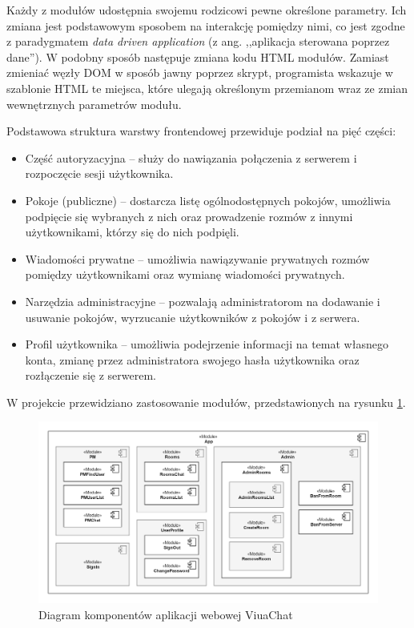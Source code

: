 Każdy z modułów udostępnia swojemu rodzicowi pewne określone parametry. Ich zmiana
jest podstawowym sposobem na interakcję pomiędzy nimi, co jest zgodne z
paradygmatem \textit{data driven application} (z ang. ,,aplikacja sterowana
poprzez dane''). W podobny sposób następuje zmiana kodu HTML modułów. Zamiast
zmieniać węzły DOM w sposób jawny poprzez skrypt, programista wskazuje w
szablonie HTML te miejsca, które ulegają określonym przemianom wraz ze
zmian wewnętrznych parametrów modułu.

Podstawowa struktura warstwy frontendowej przewiduje podział na
pięć części:
\begin{itemize}
	\item Część autoryzacyjna -- służy do nawiązania połączenia z
	serwerem i rozpoczęcie sesji użytkownika.

	\item Pokoje (publiczne) -- dostarcza listę ogólnodostępnych pokojów,
	umożliwia podpięcie się wybranych z nich oraz prowadzenie rozmów z
	innymi użytkownikami, którzy się do nich podpięli.

	\item Wiadomości prywatne -- umożliwia nawiązywanie prywatnych
	rozmów pomiędzy użytkownikami oraz wymianę wiadomości prywatnych.

	\item Narzędzia administracyjne -- pozwalają administratorom
	na dodawanie i usuwanie pokojów, wyrzucanie użytkowników z pokojów
	i z serwera.

	\item Profil użytkownika -- umożliwia podejrzenie informacji na
	temat własnego konta, zmianę przez administratora swojego hasła
	użytkownika oraz rozłączenie się z serwerem.

\end{itemize}

W projekcie przewidziano zastosowanie modułów, przedstawionych na rysunku \ref{diag-komp-front}.

\begin{figure}[!htp]
	\centering
	\includegraphics[width=\textwidth]{chat/fig/pck-diag-front}
	\caption{Diagram komponentów aplikacji webowej ViuaChat}
	\label{diag-komp-front}
\end{figure}

